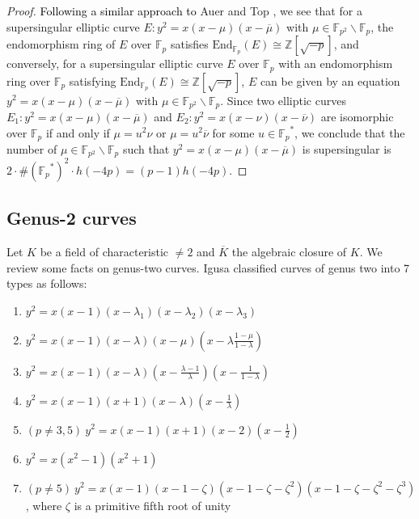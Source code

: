 \documentclass[10pt,a4paper]{amsart}
\theoremstyle{plain}
\newcommand{\lm}{\lambda}
\newcommand{\fp}{\mathbb{F}_p}
\newcommand{\fpp}{\mathbb{F}_{p^2}}
\newcommand{\bZ}{\mathbb{Z}}
\begin{document}
\begin{proof}
    \textcolor{black}{Following a similar approach to} Auer and Top {\cite[Proposition 3.2.]{AT02}}, we see that for a supersingular elliptic curve $E:y^2=x(x-\mu)(x-\overline{\mu})$ with $\mu \in \fpp \smallsetminus \fp$, the endomorphism ring of $E$ over $\fp$ satisfies ${\text{End}}_{\fp} (E) \cong \bZ[\sqrt{-p}]$, and conversely, for a supersingular elliptic curve $E$ over $\fp$ with an endomorphism ring over $\fp$ satisfying ${\text{End}}_{\fp}(E) \cong \bZ[\sqrt{-p}]$, $E$ can be given by an equation $y^2=x(x-\mu)(x-\overline{\mu})$ with $\mu \in \fpp \smallsetminus \fp$. Since two elliptic curves $E_{1}:y^2=x(x-\mu)(x-\overline{\mu})$ and $E_{2}:y^2=x(x-\nu)(x-\overline{\nu})$ are isomorphic over $\fp$ if and only if $\mu = u^2\nu$ or $\mu=u^2\overline{\nu}$ for some $u \in {\fp}^{*}$, we conclude that
    the number of $\mu \in  \fpp \smallsetminus \fp$
such that $y^2=x(x-\mu)(x-\overline{\mu})$ is supersingular is
    $2 \cdot \# \left({\fp}^{*}\right)^2 \cdot h(-4p)=(p-1)h(-4p)$.
\end{proof}

\subsection{Genus-2 curves}\label{subsec:2.2}
Let $K$ be a field of characteristic $\ne 2$ and $\overline K$ the algebraic closure of $K$. We review some facts on genus-two curves. Igusa \cite{Igusa} classified curves of genus two into 7 types as follows: 
\begin{enumerate}
   \item[(0)]$y^2=x(x-1)(x-{\lm}_1)(x-{\lm}_2)(x-{\lm}_3)$
        \item [(1)]$y^2=x(x-1)(x-\lm)(x-\mu)\left(x-\lm\frac{1-\mu}{1-\lm} \right)$
        \item[(2)]$y^2=x(x-1)(x-\lm)\left(x-\frac{\lm-1}{\lm}\right) \left(x-\frac{1}{1-\lm}\right)$
        \item[(3)] $y^2=x(x-1)(x+1)(x-\lm)\left(x-\frac{1}{\lm}\right)$
        \item[(4)]$(p\neq 3,5) \ y^2=x(x-1)(x+1)(x-2)\left(x-\frac{1}{2}\right) $
        \item[(5)]$y^2=x(x^2-1)(x^2+1) $
        \item[(6)]$(p \neq 5) \ y^2=x(x-1)(x-1-\zeta)(x-1-\zeta-{\zeta}^2)(x-1-\zeta-{\zeta}^2-{\zeta}^3)$, where $\zeta$ is a primitive fifth root of unity
    \end{enumerate}
\end{document}
